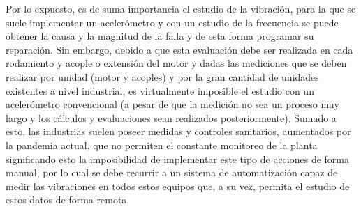 	Por lo expuesto, es de suma importancia el estudio de la vibración, para la que se suele implementar un acelerómetro y con un estudio de la frecuencia se puede obtener la causa y la magnitud de la falla y de esta forma programar su reparación. Sin embargo, debido a que esta evaluación debe ser realizada en cada rodamiento y acople o extensión del motor  y dadas las mediciones que se deben realizar por unidad (motor y acoples) y por la gran cantidad de unidades existentes a nivel industrial, es virtualmente imposible el estudio con un acelerómetro convencional (a pesar de que la medición no sea un proceso muy largo y los cálculos y evaluaciones sean realizados posteriormente). Sumado a esto, las industrias suelen poseer medidas y controles sanitarios, aumentados por la pandemia actual, que no permiten el constante monitoreo de la planta significando esto la imposibilidad de implementar este tipo de acciones de forma manual, por lo cual se debe recurrir a un sistema de automatización capaz de medir las vibraciones en todos estos equipos que, a su vez, permita el estudio de estos datos de forma remota. \\

	




